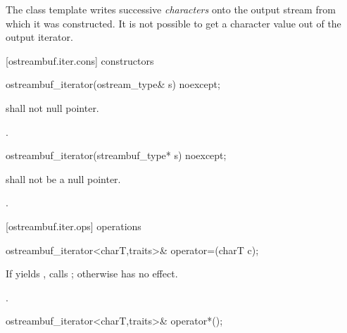 \pnum
The
class template
writes successive
\textit{characters}
onto the output stream from which it was constructed.
It is not possible to get a character value out of the output iterator.

[ostreambuf.iter.cons]{ constructors}


%
\begin{itemdecl}
ostreambuf_iterator(ostream_type& s) noexcept;
\end{itemdecl}

\begin{itemdescr}
\pnum
\requires
{}
shall not null pointer.
\end{itemdescr}

\begin{itemdescr}
\pnum
\effects
{}.
\end{itemdescr}


%
\begin{itemdecl}
ostreambuf_iterator(streambuf_type* s) noexcept;
\end{itemdecl}

\begin{itemdescr}
\pnum
\requires
{}
shall not be a null pointer.

\pnum
\effects
{}.
\end{itemdescr}

[ostreambuf.iter.ops]{ operations}

%
\begin{itemdecl}
ostreambuf_iterator<charT,traits>&
  operator=(charT c);
\end{itemdecl}

\begin{itemdescr}
\pnum
\effects
If
yields
,
calls
;
otherwise has no effect.

\pnum
\returns
{}.
\end{itemdescr}

%
\begin{itemdecl}
ostreambuf_iterator<charT,traits>& operator*();
\end{itemdecl}

